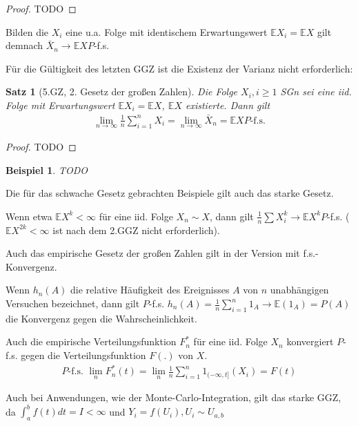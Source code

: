 \documentclass[]{article}
\newtheorem{theorem}{Satz}
\newtheorem*{example}{Beispiel}
\begin{document}
\begin{proof}
	TODO
\end{proof}

Bilden die $X_i$ eine u.a. Folge mit identischem Erwartungswert $\mathbb{E}X_i = \mathbb{E}X$ gilt demnach $\bar{X}_n\rightarrow\mathbb{E}X P$-f.s.

Für die Gültigkeit des letzten GGZ ist die Existenz der Varianz nicht erforderlich:
\begin{theorem}[5.GZ, 2. Gesetz der großen Zahlen]
	Die Folge $X_i, i\geq 1$ SGn sei eine iid. Folge mit Erwartungswert $\mathbb{E}X_i = \mathbb{E}X$, $\mathbb{E}X$ existierte. Dann gilt
	\begin{align*}
		\lim\limits_{n\rightarrow\infty}\frac{1}{n} \sum_{i=1}^{n}X_i = \lim\limits_{n\rightarrow\infty} \bar{X}_n = \mathbb{E}X P\text{-f.s.}
	\end{align*}
\end{theorem}

\begin{proof}
	TODO
\end{proof}

\begin{example}
	TODO
\end{example}

Die für das schwache Gesetz gebrachten Beispiele gilt auch das starke Gesetz.

Wenn etwa $\mathbb{E}X^k < \infty$ für eine iid. Folge $X_n\sim X$, dann gilt $\frac{1}{n}\sum X_i^k \rightarrow \mathbb{E}X^k P$-f.s. ($\mathbb{E}X^{2k} < \infty$ ist nach dem 2.GGZ nicht erforderlich).

Auch das empirische Gesetz der großen Zahlen gilt in der Version mit f.s.- Konvergenz.

Wenn $h_n(A)$ die relative Häufigkeit des Ereignisses $A$ von $n$ unabhängigen Versuchen bezeichnet, dann gilt $P$-f.s. $h_n(A)=\frac{1}{n}\sum_{i=1}^{n}1_{A}\rightarrow\mathbb{E}(1_A) = P(A)$ die Konvergenz gegen die Wahrscheinlichkeit.

Auch die empirische Verteilungsfunktion $F_n^*$ für eine iid. Folge $X_n$ konvergiert $P$-f.s. gegen die Verteilungsfunktion $F(.)$ von $X$.
\begin{align*}
	P\text{-f.s. } \lim_n F_n^*(t) = \lim_n \frac{1}{n}\sum_{i=1}^{n} 1_{(-\infty,t]}(X_i) = F(t)
\end{align*}

Auch bei Anwendungen, wie der Monte-Carlo-Integration, gilt das starke GGZ, da $\int_{a}^{b} f(t) dt = I < \infty$ und $Y_i=f(U_i), U_i \sim U_{a,b}$
\end{document}
